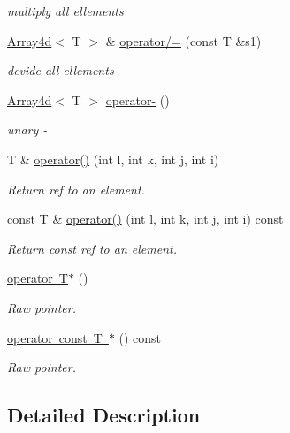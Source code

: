 \begin{DoxyCompactItemize}
\begin{DoxyCompactList}\small\item\em multiply all ellements \end{DoxyCompactList}\item 
\mbox{\hyperlink{classXMLArray_1_1Array4d}{Array4d}}$<$ T $>$ \& \mbox{\hyperlink{classXMLArray_1_1Array4d_a22b262f7b7905313ae8e21d5e2d717a7}{operator/=}} (const T \&s1)
\begin{DoxyCompactList}\small\item\em devide all ellements \end{DoxyCompactList}\item 
\mbox{\hyperlink{classXMLArray_1_1Array4d}{Array4d}}$<$ T $>$ \mbox{\hyperlink{classXMLArray_1_1Array4d_a33d29c88630265c416d8e8a7355f166e}{operator-\/}} ()
\begin{DoxyCompactList}\small\item\em unary -\/ \end{DoxyCompactList}\item 
T \& \mbox{\hyperlink{classXMLArray_1_1Array4d_aed3f4e517b15358348150e8212189b60}{operator()}} (int l, int k, int j, int i)
\begin{DoxyCompactList}\small\item\em Return ref to an element. \end{DoxyCompactList}\item 
const T \& \mbox{\hyperlink{classXMLArray_1_1Array4d_ae9076800aed9ec98d434d01fcaf4ba3a}{operator()}} (int l, int k, int j, int i) const
\begin{DoxyCompactList}\small\item\em Return const ref to an element. \end{DoxyCompactList}\item 
\mbox{\hyperlink{classXMLArray_1_1Array4d_a25e918248c9191d04788cce2e0116bf1}{operator T$\ast$}} ()
\begin{DoxyCompactList}\small\item\em Raw pointer. \end{DoxyCompactList}\item 
\mbox{\hyperlink{classXMLArray_1_1Array4d_abe07755f692bf1df5acf5b8b9cd266cb}{operator const T $\ast$}} () const
\begin{DoxyCompactList}\small\item\em Raw pointer. \end{DoxyCompactList}\end{DoxyCompactItemize}


\subsection{Detailed Description}
